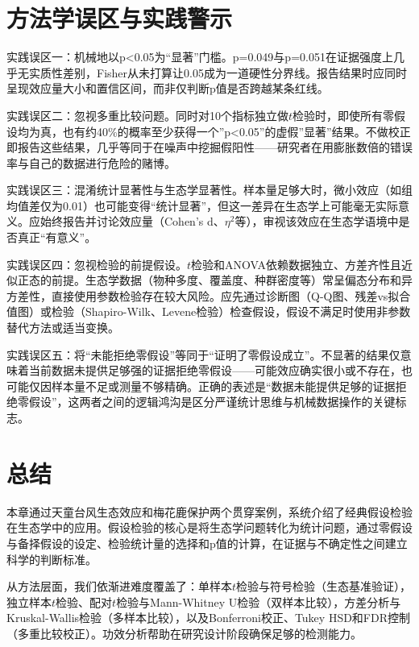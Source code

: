 \documentclass[
  twoside,12pt,fontset=none]{ctexbook}
\begin{document}
\hypertarget{ux65b9ux6cd5ux5b66ux8befux533aux4e0eux5b9eux8df5ux8b66ux793a-4}{%
\section{方法学误区与实践警示}\label{ux65b9ux6cd5ux5b66ux8befux533aux4e0eux5b9eux8df5ux8b66ux793a-4}}

实践误区一：机械地以p\textless0.05为``显著''门槛。p=0.049与p=0.051在证据强度上几乎无实质性差别，Fisher从未打算让0.05成为一道硬性分界线。报告结果时应同时呈现效应量大小和置信区间，而非仅判断p值是否跨越某条红线。

实践误区二：忽视多重比较问题。同时对10个指标独立做\(t\)检验时，即使所有零假设均为真，也有约40\%的概率至少获得一个''p\textless0.05''的虚假''显著''结果。不做校正即报告这些结果，几乎等同于在噪声中挖掘假阳性------研究者在用膨胀数倍的错误率与自己的数据进行危险的赌博。

实践误区三：混淆统计显著性与生态学显著性。样本量足够大时，微小效应（如组均值差仅为0.01）也可能变得``统计显著''，但这一差异在生态学上可能毫无实际意义。应始终报告并讨论效应量（Cohen's d、\(\eta^2\)等），审视该效应在生态学语境中是否真正``有意义''。

实践误区四：忽视检验的前提假设。\(t\)检验和ANOVA依赖数据独立、方差齐性且近似正态的前提。生态学数据（物种多度、覆盖度、种群密度等）常呈偏态分布和异方差性，直接使用参数检验存在较大风险。应先通过诊断图（Q-Q图、残差vs拟合值图）或检验（Shapiro-Wilk、Levene检验）检查假设，假设不满足时使用非参数替代方法或适当变换。

实践误区五：将``未能拒绝零假设''等同于``证明了零假设成立''。不显著的结果仅意味着当前数据未提供足够强的证据拒绝零假设------可能效应确实很小或不存在，也可能仅因样本量不足或测量不够精确。正确的表述是``数据未能提供足够的证据拒绝零假设''，这两者之间的逻辑鸿沟是区分严谨统计思维与机械数据操作的关键标志。

\hypertarget{ux603bux7ed3-5}{%
\section{总结}\label{ux603bux7ed3-5}}

本章通过天童台风生态效应和梅花鹿保护两个贯穿案例，系统介绍了经典假设检验在生态学中的应用。假设检验的核心是将生态学问题转化为统计问题，通过零假设与备择假设的设定、检验统计量的选择和p值的计算，在证据与不确定性之间建立科学的判断标准。

从方法层面，我们依渐进难度覆盖了：单样本\(t\)检验与符号检验（生态基准验证），独立样本\(t\)检验、配对\(t\)检验与Mann-Whitney U检验（双样本比较），方差分析与Kruskal-Wallis检验（多样本比较），以及Bonferroni校正、Tukey HSD和FDR控制（多重比较校正）。功效分析帮助在研究设计阶段确保足够的检测能力。
\end{document}
